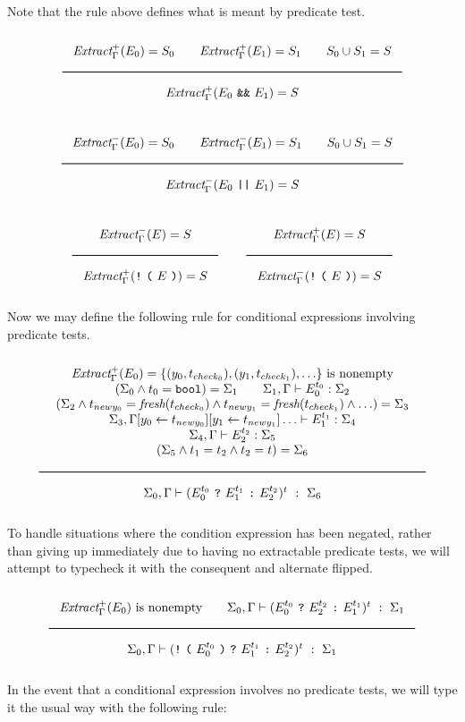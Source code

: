 Note that the rule above defines what is meant by predicate test.

\[
\Rule
{\ExtractPos_\Gamma(E_0) = S_0 \qquad \ExtractPos_\Gamma(E_1) = S_1 \qquad S_0 \cup S_1 = S}
{\ExtractPos_\Gamma(E_0\ \AndOp\ E_1) = S}
\]

\[
\Rule
{\ExtractNeg_\Gamma(E_0) = S_0 \qquad \ExtractNeg_\Gamma(E_1) = S_1 \qquad S_0 \cup S_1 = S}
{\ExtractNeg_\Gamma(E_0\ \OrOp\ E_1) = S}
\]

\[
\Rule
{\ExtractNeg_\Gamma(E) = S}
{\ExtractPos_\Gamma(\texttt{!}\ \texttt{(}\ E\ \texttt{)}) = S}
\qquad
\Rule
{\ExtractPos_\Gamma(E) = S}
{\ExtractNeg_\Gamma(\texttt{!}\ \texttt{(}\ E\ \texttt{)}) = S}
\]

Now we may define the following rule for conditional expressions involving predicate tests.

\[
  \Rule{
  \begin{array}{c}
  \ExtractPos_\Gamma(E_0) = \{ (y_0, t_{check_0}), (y_1, t_{check_1}), \ldots \}
  \text{ is nonempty}
  \\
  (\Sigma_0
  \wedge t_0 = \Bool
  ) = \Sigma_1
  \qquad
  \Sigma_1, \Gamma \vdash E_0^{t_0} : \Sigma_2
  \\
  (\Sigma_2
  \wedge t_{newy_0} = \textit{fresh}(t_{check_0})
  \wedge t_{newy_1} = \textit{fresh}(t_{check_1})
  \wedge \ldots
  ) = \Sigma_3
  \\
  \Sigma_3, \Gamma [ y_0 \leftarrow t_{newy_0} ][ y_1 \leftarrow t_{newy_1} ]\ldots \vdash E_1^{t_1} : \Sigma_4
  \\
  \Sigma_4, \Gamma \vdash E_2^{t_2} : \Sigma_5
  \\
  (\Sigma_5 \wedge t_1 = t_2 \wedge t_2 = t) = \Sigma_{6}
  \end{array}
  }{
  \Sigma_0, \Gamma \vdash ( E_0^{t_0}\ \ThenOp\ E_1^{t_1}\ \ElseOp\ E_2^{t_2})^t\ :\ \Sigma_6}
\]

To handle situations where the condition expression has been negated,
rather than giving up immediately due to having no extractable predicate tests,
we will attempt to typecheck it with the consequent and alternate flipped.

\[
\Rule{
  \ExtractPos_\Gamma(E_0) \text{ is nonempty}
  \qquad
  \Sigma_0, \Gamma \vdash ( E_0^{t_0}\ \ThenOp\ E_2^{t_2}\ \ElseOp\ E_1^{t_1})^t\ :\ \Sigma_1
}{
  \Sigma_0, \Gamma \vdash ( \texttt{!}\ \texttt{(}\ E_0^{t_0}\ \texttt{)}\ \ThenOp\ E_1^{t_1}\ \ElseOp\ E_2^{t_2})^t\ :\ \Sigma_1
}
\]

In the event that a conditional expression involves no predicate tests,
we will type it the usual way with the following rule:


